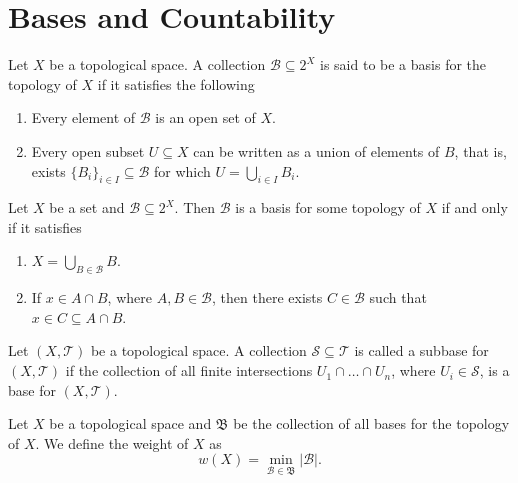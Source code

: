 \section{Bases and Countability}

\begin{definition}[Base]\label{def: base}
  Let \(X\) be a topological space. A collection \(\mathcal B \subseteq 2^X\) is
  said to be a basis for the topology of \(X\) if it satisfies the following
  \begin{enumerate}[(B1)]
    \item Every element of \(\mathcal B\) is an open set of \(X\).
    \item Every open subset \(U \subseteq X\) can be written as a union of
      elements of \(B\), that is, exists \(\{B_i\}_{i \in I} \subseteq \mathcal
      B\) for which \(U = \bigcup_{i \in  I} B_i\).
  \end{enumerate}
\end{definition}

\begin{proposition}
  Let \(X\) be a set and \(\mathcal B \subseteq 2^X\). Then \(\mathcal B\) is a
  basis for some topology of \(X\) if and only if it satisfies
  \begin{enumerate}[(1)]
    \item \(X = \bigcup_{B \in \mathcal B} B\).
    \item If \(x \in A \cap B\), where \(A, B \in \mathcal B\), then there
      exists \(C \in \mathcal B\) such that \(x \in C \subseteq A \cap B\).
  \end{enumerate}
\end{proposition}


\begin{definition}[Subbase]\label{def: subbase}
  Let \((X, \mathcal T)\) be a topological space. A collection \(\mathcal S
  \subseteq \mathcal T\) is called a subbase for \((X, \mathcal T)\) if the
  collection of all finite intersections \(U_1 \cap \dots \cap U_n\), where
  \(U_i \in \mathcal S\), is a base for \((X, \mathcal T)\).
\end{definition}

\begin{definition}[Weight]\label{def: weight}
  Let \(X\) be a topological space and \(\mathfrak B\) be the collection of
  all bases for the topology of \(X\). We define the weight of \(X\) as
  \[
    w(X) = \min_{\mathcal B \in \mathfrak B} |\mathcal B|.
  \] 
\end{definition}

